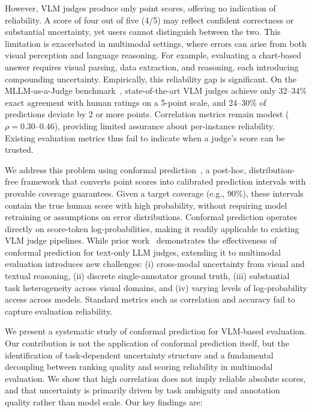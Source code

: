 \documentclass{article}
\begin{document}
However, VLM judges produce only point scores, offering no indication of reliability. A score of four out of five (4/5) may reflect confident correctness or substantial uncertainty, yet users cannot distinguish between the two. This limitation is exacerbated in multimodal settings, where errors can arise from both visual perception and language reasoning. For example, evaluating a chart-based answer requires visual parsing, data extraction, and reasoning, each introducing compounding uncertainty. Empirically, this reliability gap is significant. On the MLLM-as-a-Judge benchmark~\citep{chen2024mllmasajudge}, state-of-the-art VLM judges achieve only 32--34\% exact agreement with human ratings on a 5-point scale, and 24--30\% of predictions deviate by 2 or more points. Correlation metrics remain modest ($\rho = 0.30$--$0.46$), providing limited assurance about per-instance reliability. Existing evaluation metrics thus fail to indicate when a judge's score can be trusted.

We address this problem using conformal prediction~\citep{vovk2005algorithmic}, a post-hoc, distribution-free framework that converts point scores into calibrated prediction intervals with provable coverage guarantees. Given a target coverage (e.g., 90\%), these intervals contain the true human score with high probability, without requiring model retraining or assumptions on error distributions. Conformal prediction operates directly on score-token log-probabilities, making it readily applicable to existing VLM judge pipelines. While prior work~\citep{sheng2025analyzing} demonstrates the effectiveness of conformal prediction for text-only LLM judges, extending it to multimodal evaluation introduces new challenges: (i) cross-modal uncertainty from visual and textual reasoning, (ii) discrete single-annotator ground truth, (iii) substantial task heterogeneity across visual domains, and (iv) varying levels of log-probability access across models. Standard metrics such as correlation and accuracy fail to capture evaluation reliability. 

We present a systematic study of conformal prediction for VLM-based evaluation. Our contribution is not the application of conformal prediction itself, but the identification of task-dependent uncertainty structure and a fundamental decoupling between ranking quality and scoring reliability in multimodal evaluation. We show that high correlation does not imply reliable absolute scores, and that uncertainty is primarily driven by task ambiguity and annotation quality rather than model scale. Our key findings are:
\end{document}

